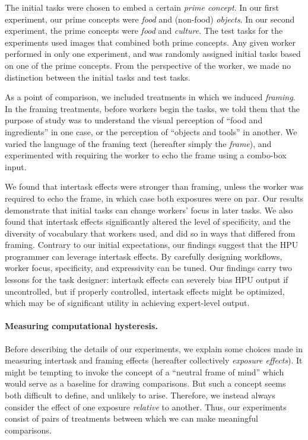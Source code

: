 \documentclass[12pt]{article}
\begin{document}
The initial tasks were chosen to embed a certain \textit{prime concept}.
In our first experiment, our prime concepts were \textit{food} and (non-food) 
\textit{objects}.  In our second experiment, the prime concepts were 
\textit{food} and \textit{culture}.  The test tasks for the experiments used 
images that combined both prime concepts. Any given worker performed in only 
one experiment, and was randomly assigned initial tasks based on one of the 
prime concepts.  From the perspective of the worker, we made no distinction 
between the initial tasks and test tasks.

As a point of comparison, we included treatments in which we induced
\textit{framing}.
In the framing treatments, before workers begin the tasks, we told them that 
the purpose of study was to understand the visual perception of 
``food and ingredients'' in one case, or the 
perception of ``objects and tools'' in another.  We varied the language of 
the framing text (hereafter simply the \textit{frame}), and experimented with 
requiring the worker to echo the frame using a combo-box input.

We found that intertask effects were stronger than framing, unless the worker
was required to echo the frame, in which case both exposures were on par.  
Our results demonstrate that initial tasks can change 
workers' focus in later tasks.  We also found that intertask effects 
significantly altered the level of specificity, and the diversity of 
vocabulary that workers used, and did so in ways that differed from framing.
Contrary to our initial expectations, our findings suggest that the HPU 
programmer can leverage intertask effects.  By carefully designing workflows,
worker focus, specificity, and expressivity can be tuned.  Our 
findings carry two lessons for the task designer: intertask
effects can severely bias HPU output if uncontrolled, but if properly 
controlled, intertask effects might be optimized, which may be of significant 
utility in achieving expert-level output.

\paragraph*{Measuring computational hysteresis.}
Before describing the details of our experiments, we explain some 
choices made in measuring intertask and framing effects 
(hereafter collectively \textit{exposure effects}).  
It might be tempting to invoke the concept of a ``neutral frame of mind'' 
which would serve as a baseline for drawing comparisons.  But such a concept 
seems both difficult to define, and unlikely to arise.
Therefore, we instead always consider the effect of one exposure 
\textit{relative} to another.  Thus, our experiments consist of 
pairs of treatments between which we can make meaningful comparisons.
\end{document}
